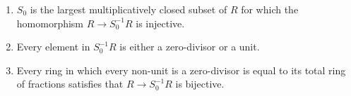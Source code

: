 \begin{enumerate}[label=(\roman*)]
	\item $S_0$ is the largest multiplicatively closed subset of $R$ for which
		the homomorphism $R\to S_0^{-1}R$ is injective.
	\item Every element in $S_0^{-1}R$ is either a zero-divisor or a unit.
	\item Every ring in which every non-unit is a zero-divisor is equal to its
		total ring of fractions satisfies that $R\to S^{-1}_0R$ is bijective.
\end{enumerate}
